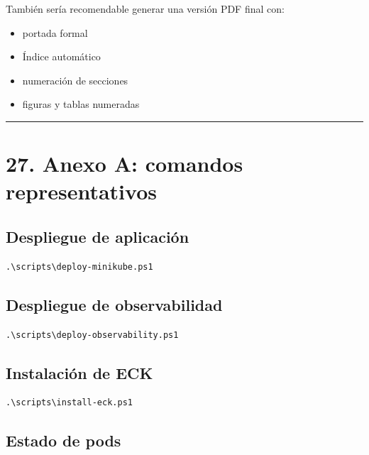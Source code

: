 \documentclass[
a4paper,
12pt]{report}
\providecommand{\tightlist}{%
  \setlength{\itemsep}{0pt}\setlength{\parskip}{0pt}}
\begin{document}
También sería recomendable generar una versión PDF final con:

\begin{itemize}
\tightlist
\item
  portada formal
\item
  Índice automático
\item
  numeración de secciones
\item
  figuras y tablas numeradas
\end{itemize}

\begin{center}\rule{0.5\linewidth}{0.5pt}\end{center}

\chapter{27. Anexo A: comandos
representativos}\label{anexo-a-comandos-representativos}

\section{Despliegue de aplicación}\label{despliegue-de-aplicaciuxf3n}

\begin{verbatim}
.\scripts\deploy-minikube.ps1
\end{verbatim}

\section{Despliegue de
observabilidad}\label{despliegue-de-observabilidad}

\begin{verbatim}
.\scripts\deploy-observability.ps1
\end{verbatim}

\section{Instalación de ECK}\label{instalaciuxf3n-de-eck}

\begin{verbatim}
.\scripts\install-eck.ps1
\end{verbatim}

\section{Estado de pods}\label{estado-de-pods}
\end{document}
